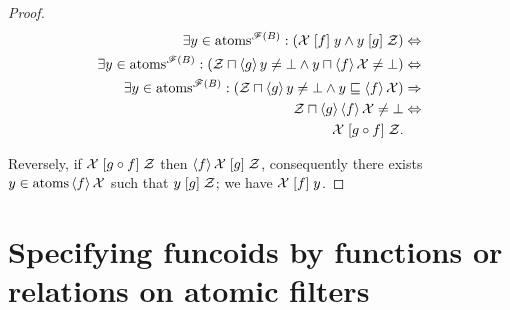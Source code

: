 \begin{proof}
~
\begin{align*}
\exists y\in\operatorname{atoms}^{\mathscr{F}(B)}:(\mathcal{X}\mathrel{\left[f\right]}y\land y\mathrel{\left[g\right]}\mathcal{Z}) & \Leftrightarrow\\
\exists y\in\operatorname{atoms}^{\mathscr{F}(B)}:(\mathcal{Z}\sqcap\left\langle g\right\rangle y\ne\bot\land y\sqcap\left\langle f\right\rangle\mathcal{X}\ne\bot) & \Leftrightarrow\\
\exists y\in\operatorname{atoms}^{\mathscr{F}(B)}:(\mathcal{Z}\sqcap\left\langle g\right\rangle y\ne\bot\land y\sqsubseteq\left\langle f\right\rangle\mathcal{X}) &
\Rightarrow\\
\mathcal{Z}\sqcap\left\langle g\right\rangle\left\langle f\right\rangle\mathcal{X}\ne\bot &
\Leftrightarrow\\
\mathcal{X}\mathrel{\left[g\circ f\right]}\mathcal{Z}.
\end{align*}


Reversely, if $\mathcal{X}\mathrel{\left[g\circ f\right]}\mathcal{Z}$ then $\left\langle f\right\rangle\mathcal{X}\mathrel{\left[g\right]}\mathcal{Z}$,
consequently there exists $y\in\operatorname{atoms}\left\langle f\right\rangle\mathcal{X}$ such that
$y\mathrel{\left[g\right]}\mathcal{Z}$; we have $\mathcal{X}\mathrel{\left[f\right]}y$.\end{proof}

\section{Specifying funcoids by functions or relations on atomic filters}

